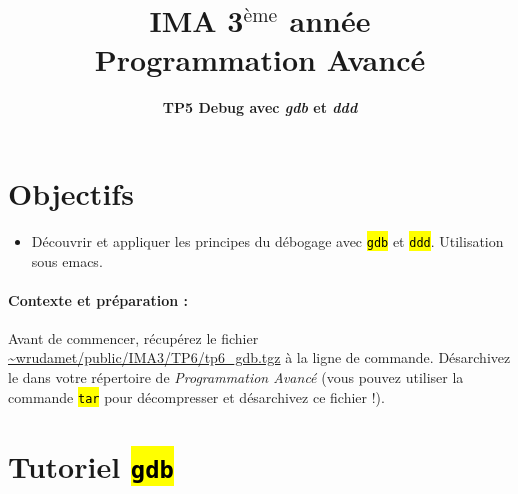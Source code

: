 \documentclass[final, pdftex, a4paper, openbib, ]{article}
\title{IMA 3$^{\mbox{\`eme}}$ année\\ Programmation Avancé
}
\author{\huge \textbf{TP5 Debug avec \textit{gdb} et \textit{ddd}}}
\date{}
\let\OldTexttt\texttt
\renewcommand{\texttt}[1]{\OldTexttt{\hl{#1}}}
\begin{document}
\posttitle{\par\end{center}}
\setlength{\droptitle}{-45pt}
\maketitle

\vspace{-1.7cm}
\section{Objectifs}

\begin{itemize}
	\item Découvrir et appliquer les principes du débogage avec \texttt{gdb} et \texttt{ddd}. Utilisation sous emacs.
\end{itemize}


\paragraph{Contexte et préparation : } Avant de commencer, récupérez le fichier \url{~wrudamet/public/IMA3/TP6/tp6_gdb.tgz} à la ligne de commande. Désarchivez le dans votre répertoire de \textit{Programmation Avancé} (vous pouvez utiliser la commande \texttt{tar} pour décompresser et désarchivez ce fichier !).



\section{Tutoriel \texttt{gdb}}
\end{document}
